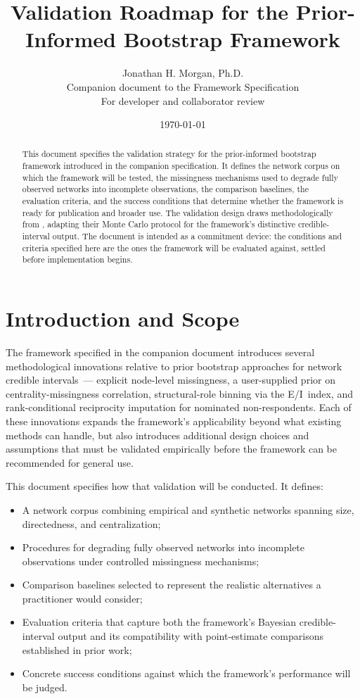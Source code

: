\documentclass[11pt]{article}
\title{Validation Roadmap for the Prior-Informed Bootstrap Framework}
\author{Jonathan H. Morgan, Ph.D.\\
\small Companion document to the Framework Specification\\
\small For developer and collaborator review}
\date{\today}
\begin{document}
\maketitle

\begin{abstract}
This document specifies the validation strategy for the prior-informed bootstrap framework introduced in the companion specification. It defines the network corpus on which the framework will be tested, the missingness mechanisms used to degrade fully observed networks into incomplete observations, the comparison baselines, the evaluation criteria, and the success conditions that determine whether the framework is ready for publication and broader use. The validation design draws methodologically from \citet{SmithMorganMoody2022}, adapting their Monte Carlo protocol for the framework's distinctive credible-interval output. The document is intended as a commitment device: the conditions and criteria specified here are the ones the framework will be evaluated against, settled before implementation begins.
\end{abstract}

\section{Introduction and Scope}

The framework specified in the companion document introduces several methodological innovations relative to prior bootstrap approaches for network credible intervals~--- explicit node-level missingness, a user-supplied prior on centrality-missingness correlation, structural-role binning via the E/I~index, and rank-conditional reciprocity imputation for nominated non-respondents. Each of these innovations expands the framework's applicability beyond what existing methods can handle, but also introduces additional design choices and assumptions that must be validated empirically before the framework can be recommended for general use.

This document specifies how that validation will be conducted. It defines:
\begin{itemize}[leftmargin=*, itemsep=2pt]
  \item A network corpus combining empirical and synthetic networks spanning size, directedness, and centralization;
  \item Procedures for degrading fully observed networks into incomplete observations under controlled missingness mechanisms;
  \item Comparison baselines selected to represent the realistic alternatives a practitioner would consider;
  \item Evaluation criteria that capture both the framework's Bayesian credible-interval output and its compatibility with point-estimate comparisons established in prior work;
  \item Concrete success conditions against which the framework's performance will be judged.
\end{itemize}
\end{document}
